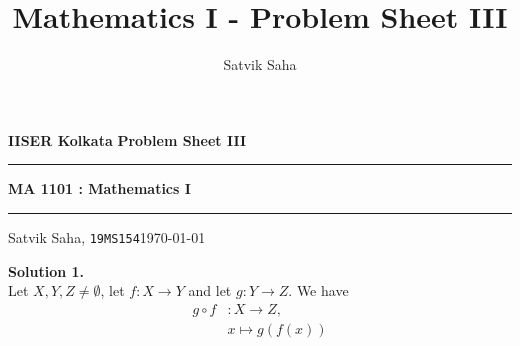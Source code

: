 \documentclass[10pt]{article}
\title{Mathematics I - Problem Sheet III}
\author{Satvik Saha}
\date{}
\begin{document}
        \par\textbf{IISER Kolkata} \hfill \textbf{Problem Sheet III}
        \vspace{3pt}
        \hrule
        \vspace{3pt}
        \begin{center}
                \LARGE{\textbf{MA 1101 : Mathematics I}}
        \end{center}
        \vspace{3pt}
        \hrule
        \vspace{3pt}
        Satvik Saha, \texttt{19MS154}\hfill\today
        \vspace{20pt}

        \textbf{Solution 1.}\\
        Let $X, Y, Z \neq \emptyset$, let $ f : X \to Y $ and let $ g : Y \to Z $.
        We have
        \begin{align*}
                g\circ f &: X \to Z, \\
                &x \mapsto  g(f(x))
        \end{align*}
\end{document}
